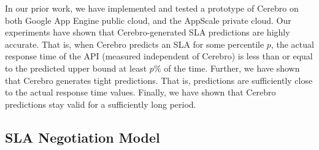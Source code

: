 In our prior work, we have implemented and tested a prototype of Cerebro on both Google 
App Engine public cloud, and the AppScale private cloud.
Our experiments have shown that Cerebro-generated SLA predictions are highly accurate. That is, when 
Cerebro predicts an SLA for some percentile $p$, the actual response time of the API (measured
independent of Cerebro) is less
than or equal to the predicted upper bound at least $p\%$ of the time. Further, we have shown that Cerebro
generates tight predictions. That is, predictions are sufficiently close to the actual response time
values. Finally, we have shown that Cerebro predictions stay valid for a sufficiently long period.  

\subsection{SLA Negotiation Model}